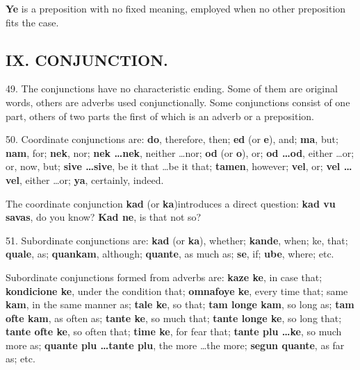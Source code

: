 \textbf{Ye} is a preposition with no fixed meaning, employed when no other preposition fits the case.

\subsection*{IX. CONJUNCTION.}
49. The conjunctions have no characteristic ending. Some of them are original words, others are adverbs used conjunctionally. Some conjunctions consist of one part, others of two parts the first of which is an adverb or a preposition. 

50. Coordinate conjunctions are: \textbf{do}, therefore, then; \textbf{ed} (or \textbf{e})\footnotemark[1], and; \textbf{ma}, but; \textbf{nam}, for; \textbf{nek}, nor; \textbf{nek \ldots nek}, neither \ldots nor; \textbf{od} (or \textbf{o})\footnotemark[1], or; \textbf{od \ldots od}, either \ldots or; or, now, but; \textbf{sive \ldots sive}, be it that \ldots be it that; \textbf{tamen}, however; \textbf{vel}, or; \textbf{vel \ldots vel}, either \ldots or; \textbf{ya}, certainly, indeed. 

The coordinate conjunction \textbf{kad} (or \textbf{ka})\footnotemark[1] introduces a direct question: \textbf{kad vu savas}, do you know? \textbf{Kad ne}, is that not so? 

51. Subordinate conjunctions are: \textbf{kad} (or \textbf{ka}), whether; \textbf{kande}, when; ke, that; \textbf{quale}, as; \textbf{quankam}, although; \textbf{quante}, as much as; \textbf{se}, if; \textbf{ube}, where; etc. 

Subordinate conjunctions formed from adverbs are: \textbf{kaze ke}, in case that; \textbf{kondicione ke}, under the condition that; \textbf{omnafoye ke}, every time that; same \textbf{kam}, in the same manner as; \textbf{tale ke}, so that; \textbf{tam longe kam}, so long as; \textbf{tam ofte kam}, as often as; \textbf{tante ke}, so much that; \textbf{tante longe ke}, so long that; \textbf{tante ofte ke}, so often that; \textbf{time ke}, for fear that; \textbf{tante plu \ldots ke}, so much more as; \textbf{quante plu \ldots tante plu}, the more \ldots the more; \textbf{segun quante}, as far as; etc. 

